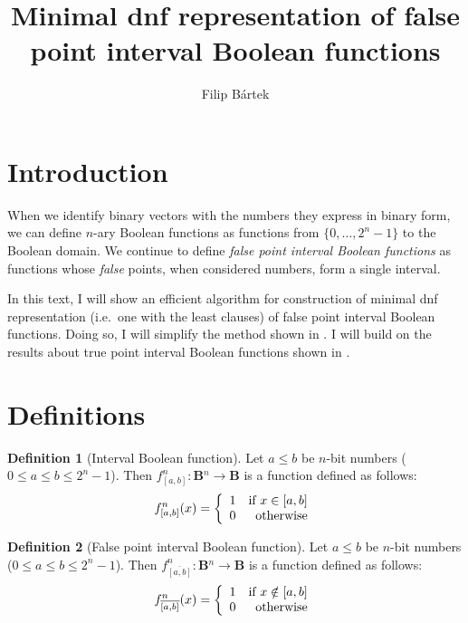 \documentclass{article}
\author{Filip Bártek}
\title{Minimal \acrshort{dnf} representation of false point interval Boolean functions}
\theoremstyle{plain}
\theoremstyle{definition}
\newtheorem{definition}{Definition}[section]
\newcommand{\interval}[2]{[#1, #2]}
\newcommand{\compl}[1]{\overline{#1}}
\newcommand{\finterval}[2]{\compl{\interval{#1}{#2}}}
\newcommand{\booldom}{\mathbf{B}} %
\begin{document}
\maketitle

\section{Introduction}
When we identify binary vectors with the numbers they express in binary form,
we can define $n$-ary Boolean functions
as functions from $\{0, \ldots, 2^n - 1\}$ to the Boolean domain.
We continue to define \emph{false point interval Boolean functions}
as functions whose \emph{false} points,
when considered numbers,
form a single interval.

In this text,
I will show an efficient algorithm
for construction of minimal \acrshort{dnf} representation
(i.e.~one with the least clauses)
of false point interval Boolean functions.
Doing so, I will simplify the method shown in \cite{Dubovsky2012}.
I will build on the results about true point interval Boolean functions
shown in \cite{Schieber2005154}.

\section{Definitions}

\begin{definition}[Interval Boolean function]
Let $a \leq b$ be $n$-bit numbers ($0 \leq a \leq b \leq 2^n - 1$).
Then $f^n_{\interval{a}{b}}: \booldom{}^n \rightarrow \booldom{}$ is a function defined as follows:
\[f^n_{\interval{a}{b}} (x) = \left\{
  \begin{array}{lr}
    1 & $if $ x \in \interval{a}{b}\\
    0 & $otherwise$
  \end{array}
\right.
\]
\end{definition}


\begin{definition}[False point interval Boolean function]
Let $a \leq b$ be $n$-bit numbers ($0 \leq a \leq b \leq 2^n - 1$).
Then $f^n_{\finterval{a}{b}}: \booldom{}^n \rightarrow \booldom{}$ is a function defined as follows:
\[f^n_{\finterval{a}{b}} (x) = \left\{
  \begin{array}{lr}
    1 & $if $ x \notin \interval{a}{b}\\
    0 & $otherwise$
  \end{array}
\right.
\]
\end{definition}
\end{document}
